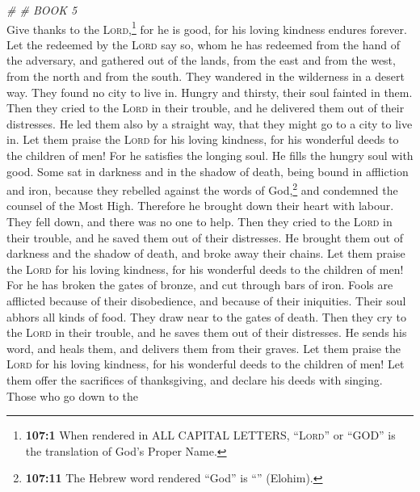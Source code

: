 \emph{\# \# BOOK 5}\\

 Give thanks to the \textsc{Lord},\footnote{\textbf{107:1}
  When rendered in ALL CAPITAL LETTERS, ``\textsc{Lord}'' or ``GOD'' is
  the translation of God's Proper Name.} for he is good, for his loving
kindness endures forever.  Let the redeemed by the
\textsc{Lord} say so, whom he has redeemed from the hand of the
adversary,  and gathered out of the lands, from the east
and from the west, from the north and from the south. 
They wandered in the wilderness in a desert way. They found no city to
live in.  Hungry and thirsty, their soul fainted in them.
 Then they cried to the \textsc{Lord} in their trouble,
and he delivered them out of their distresses.  He led
them also by a straight way, that they might go to a city to live in.
 Let them praise the \textsc{Lord} for his loving
kindness, for his wonderful deeds to the children of men! 
For he satisfies the longing soul. He fills the hungry soul with good.
 Some sat in darkness and in the shadow of death, being
bound in affliction and iron,  because they rebelled
against the words of God,\footnote{\textbf{107:11} The Hebrew word
  rendered ``God'' is ``'' (Elohim).} and condemned the
counsel of the Most High.  Therefore he brought down
their heart with labour. They fell down, and there was no one to help.
 Then they cried to the \textsc{Lord} in their trouble,
and he saved them out of their distresses.  He brought
them out of darkness and the shadow of death, and broke away their
chains.  Let them praise the \textsc{Lord} for his loving
kindness, for his wonderful deeds to the children of men!
 For he has broken the gates of bronze, and cut through
bars of iron.  Fools are afflicted because of their
disobedience, and because of their iniquities.  Their
soul abhors all kinds of food. They draw near to the gates of death.
 Then they cry to the \textsc{Lord} in their trouble, and
he saves them out of their distresses.  He sends his
word, and heals them, and delivers them from their graves.
 Let them praise the \textsc{Lord} for his loving
kindness, for his wonderful deeds to the children of men!
 Let them offer the sacrifices of thanksgiving, and
declare his deeds with singing.  Those who go down to the
